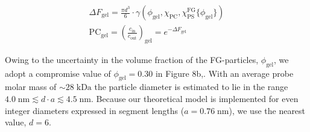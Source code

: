 \documentclass[10pt, a4paper]{article}
\begin{document}
\begin{multicols}{2}
\begin{eqnarray}
    \Delta F_{\text{gel}} =
    \frac{\pi d^3}{6} \cdot \gamma\left(
    \phi_{\text{gel}}, \chi_{\text{PC}},
    \chi_{\text{PS}}^{\text{FG}}\{ \phi_{\text{gel}} \}
    \right) \\
    \text{PC}_{\text{gel}} = \left(\frac{c_{\text{in}}}{c_{\text{out}}}\right)_{\text{gel}} = e^{-\Delta F_{\text{gel}}}
\end{eqnarray}

Owing to the uncertainty in the volume fraction of the FG-particles, $\phi_{\text{gel}}$, we adopt a compromise value of $\phi_{\text{gel}} = 0.30$ in Figure 8b,.  
With an average probe molar mass of \(\sim\!28\;\text{kDa}\) the particle diameter is estimated to lie in the range  $4.0\;\text{nm} \lesssim d\cdot a \lesssim 4.5\;\text{nm}$.
Because our theoretical model is implemented for even integer diameters expressed in segment lengths ($a = 0.76\;\text{nm}$), we use the
nearest value, $d = 6$.


\end{multicols}
\pagebreak

\begin{table}[htp]
    \centering
    \caption{Transport-related quantities extracted from the experimental studies.}
        \label{tbl:experimental}
\end{table}
\end{document}

